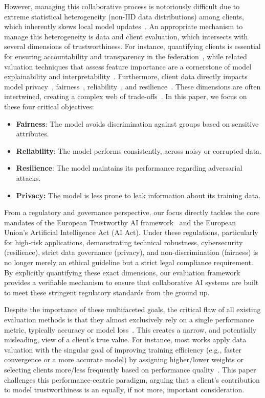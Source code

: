 \documentclass[acmsmall]{acmart}
\begin{document}
However, managing this collaborative process is notoriously difficult due to extreme statistical heterogeneity (non-IID data distributions) among clients, which inherently skews local model updates~\cite{kairouz2021advances}. An appropriate mechanism to manage this heterogeneity is data and client evaluation, which intersects with several dimensions of trustworthiness. For instance, quantifying clients is essential for ensuring accountability and transparency in the federation~\cite{siomos2023contribution}, while related valuation techniques that assess feature importance are a cornerstone of model explainability and interpretability~\cite{gunning2019xai}. Furthermore, client data directly impacts model privacy~\cite{liu2021machine}, fairness~\cite{mehrabi2021survey}, reliability~\cite{goldblum2022dataset}, and resilience~\cite{ibitoye2019threat}. These dimensions are often intertwined, creating a complex web of trade-offs~\cite{liu2020privacy, shaham2023holistic, li2024triangular}. In this paper, we focus on these four critical objectives:

\begin{itemize}
    \item \textbf{Fairness}: The model avoids discrimination against groups based on sensitive attributes.
    \item \textbf{Reliability}: The model performs consistently, across noisy or corrupted data.
    \item \textbf{Resilience}: The model maintains its performance regarding adversarial attacks.
    \item \textbf{Privacy:} The model is less prone to leak information about its training data.
\end{itemize}

From a regulatory and governance perspective, our focus directly tackles the core mandates of the European Trustworthy AI framework~\cite{kaur2022trustworthy} and the European Union's Artificial Intelligence Act (AI Act). Under these regulations, particularly for high-risk applications, demonstrating technical robustness, cybersecurity (resilience), strict data governance (privacy), and non-discrimination (fairness) is no longer merely an ethical guideline but a strict legal compliance requirement. By explicitly quantifying these exact dimensions, our evaluation framework provides a verifiable mechanism to ensure that collaborative AI systems are built to meet these stringent regulatory standards from the ground up.

Despite the importance of these multifaceted goals, the critical flaw of all existing evaluation methods is that they almost exclusively rely on a single performance metric, typically accuracy or model loss~\cite{naidu2023review}. This creates a narrow, and potentially misleading, view of a client's true value. For instance, most works apply data valuation with the singular goal of improving training efficiency (e.g., faster convergence or a more accurate model) by assigning higher/lower weights or selecting clients more/less frequently based on performance quality~\cite{gao2025fedcon, sani2026fedssv}. This paper challenges this performance-centric paradigm, arguing that a client's contribution to model trustworthiness is an equally, if not more, important consideration.
\end{document}
